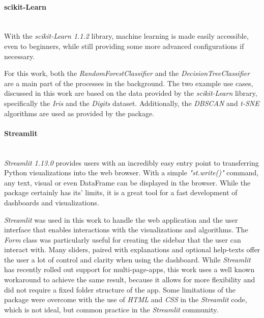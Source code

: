 \documentclass[a4paper, 12pt]{article}
\begin{document}
\paragraph{scikit-Learn}\mbox{}\\
With the \textit{scikit-Learn 1.1.2} library, machine learning is made easily accessible, even to
beginners, while still providing some more advanced configurations if necessary. \par
For this work, both the \textit{RandomForestClassifier} and the \textit{DecisionTreeClassifier}
are a main part of the processes in the background. The two example use cases, discussed in this
work are based on the data provided by the \textit{scikit-Learn} library, specifically the
\textit{Iris} and the \textit{Digits} dataset. Additionally, the \textit{DBSCAN}
\cite{ester1996density} and \textit{t-SNE} \cite{JMLR:v9:vandermaaten08a} algorithms are used as
provided by the package.

\paragraph{Streamlit}\mbox{}\\
\textit{Streamlit 1.13.0} provides users with an incredibly easy entry point to transferring Python
visualizations into the web browser. With a simple \textit{"st.write()"} command, any text,
visual or even {DataFrame} can be displayed in the browser. While the package certainly has its'
limits, it is a great tool for a fast development of dashboards and visualizations. \par
\textit{Streamlit} was used in this work to handle the web application and the user interface
that enables interactions with the visualizations and algorithms. The \textit{Form} class was
particularly useful for creating the sidebar that the user can interact with. Many sliders, paired
with explanations and optional help-texts offer the user a lot of control and clarity when using
the dashboard.
While \textit{Streamlit} has
recently rolled out support for multi-page-apps, this work uses a well known workaround to
achieve the same result, because it allows for more flexibility and did not require a fixed folder
structure of the app.
Some limitations of the package were overcome with the use of \textit{HTML} and \textit{CSS} in
the \textit{Streamlit} code, which is not ideal, but common practice in the \textit{Streamlit}
community.
\end{document}
